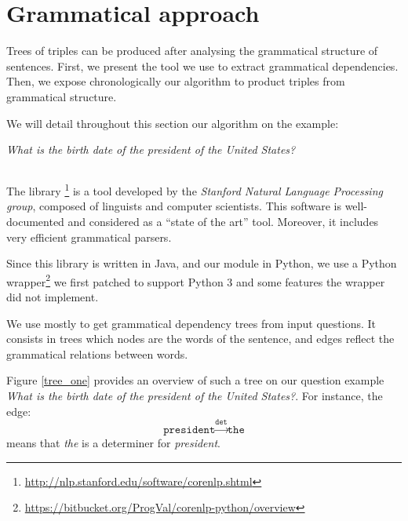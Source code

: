 \section{Grammatical approach}

Trees of triples can be produced after analysing the grammatical structure of sentences. First, we  present the tool we use to extract grammatical dependencies. Then, we expose chronologically our algorithm to product triples from grammatical structure.

We will detail throughout this section our algorithm on the example:
\begin{center}
 \textit{What is the birth date of the president of the United States?}
\end{center}


\subsection{\Stanford}

The \Stanford library \footnote{\url{http://nlp.stanford.edu/software/corenlp.shtml}} is a tool developed by the \emph{Stanford Natural Language Processing group}, composed of linguists and computer scientists. This software is well-documented and considered as a ``state of the art'' tool. Moreover, it includes very efficient grammatical parsers.

Since this library is written in Java, and our module in Python, we use a Python wrapper\footnote{\url{https://bitbucket.org/ProgVal/corenlp-python/overview}} we first patched to support Python 3 and some features the wrapper did not implement.

We use \CoreNLP mostly to get grammatical dependency trees from input questions. It consists in trees which nodes are the words of the sentence, and edges reflect the grammatical relations between words.

Figure \ref{tree_one} provides an overview of such a tree on our question example \emph{What is the birth date of the president of the United States?}. For instance, the edge:
  \[\texttt{president}\xrightarrow{\texttt{det}}\texttt{the}\]
means that \emph{the} is a determiner for \emph{president}.

